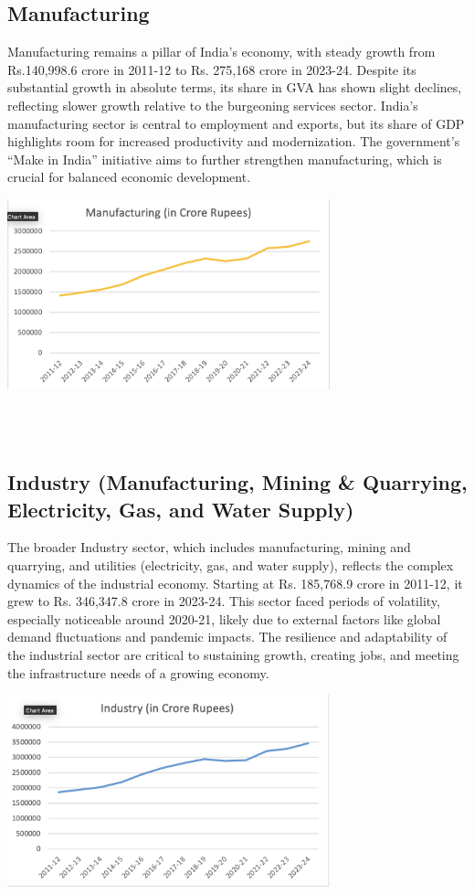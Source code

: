 \documentclass[a4paper,12pt]{extarticle} %
\begin{document}
\subsection{Manufacturing}
Manufacturing remains a pillar of India’s economy, with steady growth from Rs.140,998.6 crore in 2011-12 to Rs. 275,168 crore in 2023-24. Despite its substantial growth in absolute terms, its share in GVA has shown slight declines, reflecting slower growth relative to the burgeoning services sector. India’s manufacturing sector is central to employment and exports, but its share of GDP highlights room for increased productivity and modernization. The government’s “Make in India” initiative aims to further strengthen manufacturing, which is crucial for balanced economic development.\\
\begin{center}
    \includegraphics[width=0.7\textwidth]{Q2/2.png} 
\end{center}\\
\\
\subsection{Industry (Manufacturing, Mining \& Quarrying, Electricity, Gas, and Water Supply)}
The broader Industry sector, which includes manufacturing, mining and quarrying, and utilities (electricity, gas, and water supply), reflects the complex dynamics of the industrial economy. Starting at Rs. 185,768.9 crore in 2011-12, it grew to Rs. 346,347.8 crore in 2023-24. This sector faced periods of volatility, especially noticeable around 2020-21, likely due to external factors like global demand fluctuations and pandemic impacts. The resilience and adaptability of the industrial sector are critical to sustaining growth, creating jobs, and meeting the infrastructure needs of a growing economy.
\begin{center}
    \includegraphics[width=0.7\textwidth]{Q2/3.png} 
\end{center}\\
\end{document}
